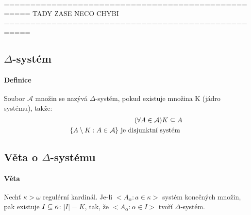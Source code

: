\documentclass[a4paper,12pt,titlepage]{article}
\begin{document}
===================================================
TADY ZASE NECO CHYBI
===================================================

\subsection{$\Delta$-systém}
\setcounter{equation}{0}
\paragraph{Definice}
Soubor $\mathcal{A}$ množin se nazývá $\Delta$-systém, pokud existuje množina K (jádro
systému), takže:
\begin{align}
	(\forall A \in \mathcal{A}) K \subseteq A \\
	\{ A \setminus K : A \in \mathcal{A} \} \text{ je disjunktní systém }
\end{align}
\subsection{Věta o $\Delta$-systému}
\setcounter{equation}{0}
\paragraph{Věta}
Nechť $\kappa > \omega$ regulérní kardinál. Je-li $< A_\alpha : a \in \kappa>$
systém konečných množin, pak existuje $I \subseteq \kappa$:
$|I| = K$,  tak, že  $<A_\alpha : \alpha \in I>$ tvoří $\Delta$-systém.
\end{document}
